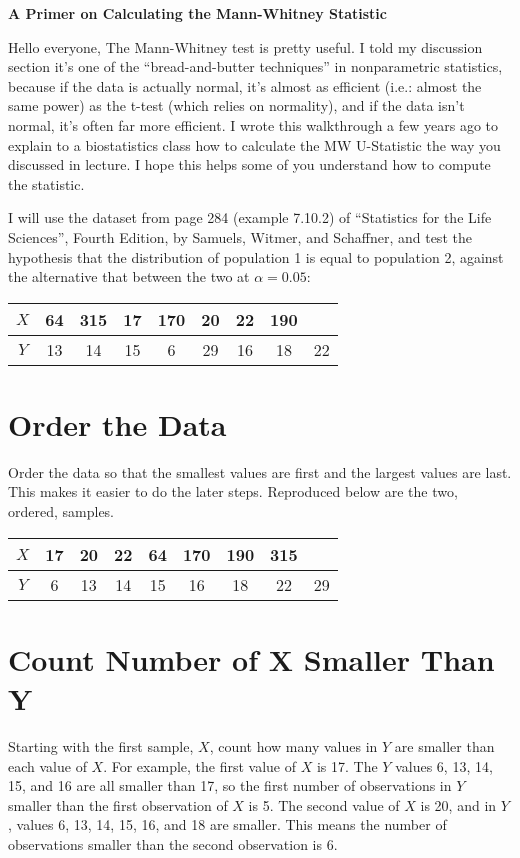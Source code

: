 \documentclass[12pt]{article}
\begin{document}
\begin{center}
\bf{A Primer on Calculating the Mann-Whitney Statistic}
\end{center}
Hello everyone,
The Mann-Whitney test is pretty useful. I told my discussion section it's one of the “bread-and-butter techniques” in nonparametric statistics, because if the data is actually normal, it's almost as efficient (i.e.: almost the same power) as the t-test (which relies on normality), and if the data isn't normal, it's often far more efficient. I wrote this walkthrough a few years ago to explain to a biostatistics class how to calculate the MW U-Statistic the way you discussed in lecture. I hope this helps some of you understand how to compute the statistic.

I will use the dataset from page 284 (example 7.10.2) of “Statistics for the Life Sciences”, Fourth Edition, by Samuels, Witmer, and Schaffner, and test the hypothesis that the distribution of population 1 is equal to population 2, 
against the alternative that between the two at $\alpha = 0.05$:
\begin{table}[H] \center
\begin{tabular}{|c|c|c|c|c|c|c|c|c|} \hline 
$X$ & 64 & 315 & 17 & 170 & 20 & 22 & 190 & \\ \hline 
$Y$ & 13 & 14 & 15 & 6 & 29 & 16 & 18 & 22 \\ \hline 
\end{tabular}
\end{table}

\section{Order the Data}
Order the data so that the smallest values are first and the largest values are last. This makes it easier to do the later steps. Reproduced below are the two, ordered, samples.
\begin{table}[H] \center
\begin{tabular}{|c|c|c|c|c|c|c|c|c|} \hline 
$X$ & 17 & 20 & 22 & 64 & 170 & 190 & 315 & \\ \hline 
$Y$ & 6 & 13 & 14 & 15 & 16 & 18 & 22 & 29 \\ \hline 
\end{tabular}
\end{table}

\section{Count Number of X Smaller Than Y}
Starting with the first sample, $X$, count how many values in $Y$ are smaller than each value of $X$. For example, the first value of $X$ is 17. The $Y$ values 6, 13, 14, 15, and 16 are all smaller than 17, so the first number of observations in $Y$ smaller than the first observation of $X$ is 5. The second value of $X$ is 20, and in $Y$, values 6, 13, 14, 15, 16, and 18 are smaller. This means the number of observations smaller than the second observation is 6.
\end{document}
